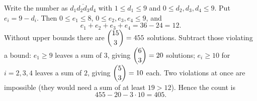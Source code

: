 Write the number as \(\overline{d_1d_2d_3d_4}\) with \(1\le d_1\le 9\) and \(0\le d_2,d_3,d_4\le 9\). Put \(e_i=9-d_i\). Then \(0\le e_1\le 8\), \(0\le e_2,e_3,e_4\le 9\), and
\[
e_1+e_2+e_3+e_4=36-24=12.
\]
Without upper bounds there are \(\dbinom{15}{3}=455\) solutions. Subtract those violating a bound: \(e_1\ge 9\) leaves a sum of \(3\), giving \(\dbinom63=20\) solutions; \(e_i\ge 10\) for \(i=2,3,4\) leaves a sum of \(2\), giving \(\dbinom53=10\) each. Two violations at once are impossible (they would need a sum of at least \(19>12\)). Hence the count is
\[
455-20-3\cdot 10=\boxed{405}.
\]

